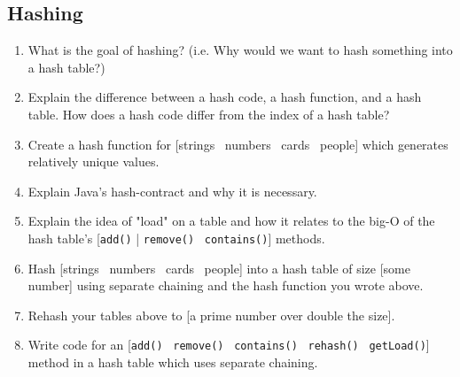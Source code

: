 \documentclass[10pt]{article}
\begin{document}
\subsection{Hashing}
\begin{enumerate}[leftmargin=0em]\addtocounter{enumi}{31}
\item What is the goal of hashing? (i.e. Why would we want to hash something into a hash table?)
\item Explain the difference between a hash code, a hash function, and a hash table. How does a hash code differ from the index of a hash table?
\item Create a hash function for [strings \vline\ numbers \vline\ cards \vline\ people] which generates relatively unique values.
\item Explain Java's hash-contract and why it is necessary.
\item Explain the idea of "load" on a table and how it relates to the big-O of the hash table's [\texttt{add()} | \texttt{remove()} \vline\ \texttt{contains()}] methods.
\item Hash [strings \vline\ numbers \vline\ cards \vline\ people] into a hash table of size [some number] using separate chaining and the hash function you wrote above.
\item Rehash your tables above to [a prime number over double the size].
\item Write code for an [\texttt{add()} \vline\ \texttt{remove()} \vline\ \texttt{contains()} \vline\ \texttt{rehash()} \vline\ \texttt{getLoad()}] method in a hash table which uses
separate chaining.
\end{enumerate}
\end{document}

